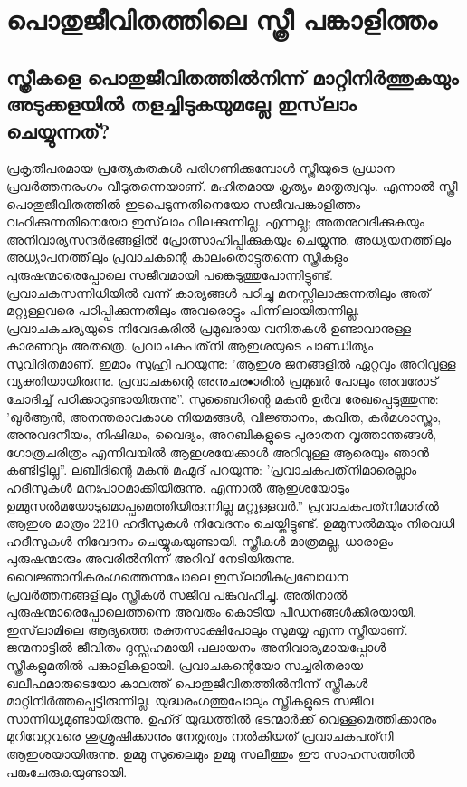 \chapter{പൊതുജീവിതത്തിലെ സ്ത്രീ പങ്കാളിത്തം }
 \section{ സ്ത്രീകളെ പൊതുജീവിതത്തില്‍നിന്ന് മാറ്റിനിര്‍ത്തുകയും അടുക്കളയില്‍ തളച്ചിടുകയുമല്ലേ ഇസ്‌ലാം ചെയ്യുന്നത്?}
   
പ്രകൃതിപരമായ പ്രത്യേകതകള്‍ പരിഗണിക്കുമ്പോള്‍ സ്ത്രീയുടെ പ്രധാന പ്രവര്‍ത്തനരംഗം വീടുതന്നെയാണ്. മഹിതമായ കൃത്യം മാതൃത്വവും. എന്നാല്‍ സ്ത്രീ പൊതുജീവിതത്തില്‍ ഇടപെടുന്നതിനെയോ സജീവപങ്കാളിത്തം വഹിക്കുന്നതിനെയോ ഇസ്‌ലാം വിലക്കുന്നില്ല. എന്നല്ല; അതനുവദിക്കുകയും അനിവാര്യസന്ദര്‍ഭങ്ങളില്‍ പ്രോത്സാഹിപ്പിക്കുകയും ചെയ്യുന്നു.
അധ്യയനത്തിലും അധ്യാപനത്തിലും പ്രവാചകന്റെ കാലംതൊട്ടുതന്നെ സ്ത്രീകളും പുരുഷന്മാരെപ്പോലെ സജീവമായി പങ്കെടുത്തുപോന്നിട്ടുണ്ട്. പ്രവാചകസന്നിധിയില്‍ വന്ന് കാര്യങ്ങള്‍ പഠിച്ചു മനസ്സിലാക്കുന്നതിലും അത് മറ്റുള്ളവരെ പഠിപ്പിക്കുന്നതിലും അവരൊട്ടും പിന്നിലായിരുന്നില്ല. പ്രവാചകചര്യയുടെ നിവേദകരില്‍ പ്രമുഖരായ വനിതകള്‍ ഉണ്ടാവാനുള്ള കാരണവും അതത്രെ.
പ്രവാചകപത്‌നി ആഇശയുടെ പാണ്ഡിത്യം സുവിദിതമാണ്. ഇമാം സുഹ്രി പറയുന്നു: 'ആഇശ ജനങ്ങളില്‍ ഏറ്റവും അറിവുള്ള വ്യക്തിയായിരുന്നു. പ്രവാചകന്റെ അനുചര•ാരില്‍ പ്രമുഖര്‍ പോലും അവരോട് ചോദിച്ച് പഠിക്കാറുണ്ടായിരുന്നു''. സുബൈറിന്റെ മകന്‍ ഉര്‍വ രേഖപ്പെടുത്തുന്നു: 'ഖുര്‍ആന്‍, അനന്തരാവകാശ നിയമങ്ങള്‍, വിജ്ഞാനം, കവിത, കര്‍മശാസ്ത്രം, അനുവദനീയം, നിഷിദ്ധം, വൈദ്യം, അറബികളുടെ പുരാതന വൃത്താന്തങ്ങള്‍, ഗോത്രചരിത്രം എന്നിവയില്‍ ആഇശയേക്കാള്‍ അറിവുള്ള ആരെയും ഞാന്‍ കണ്ടിട്ടില്ല''.
ലബീദിന്റെ മകന്‍ മഹ്മൂദ് പറയുന്നു: 'പ്രവാചകപത്‌നിമാരെല്ലാം ഹദീസുകള്‍ മനഃപാഠമാക്കിയിരുന്നു. എന്നാല്‍ ആഇശയോടും ഉമ്മുസല്‍മയോടുമൊപ്പമെത്തിയിരുന്നില്ല മറ്റുള്ളവര്‍.''
പ്രവാചകപത്‌നിമാരില്‍ ആഇശ മാത്രം 2210 ഹദീസുകള്‍ നിവേദനം ചെയ്തിട്ടുണ്ട്. ഉമ്മുസല്‍മയും നിരവധി ഹദീസുകള്‍ നിവേദനം ചെയ്യുകയുണ്ടായി. സ്ത്രീകള്‍ മാത്രമല്ല, ധാരാളം പുരുഷന്മാരും അവരില്‍നിന്ന് അറിവ് നേടിയിരുന്നു. വൈജ്ഞാനികരംഗത്തെന്നപോലെ ഇസ്‌ലാമികപ്രബോധന പ്രവര്‍ത്തനങ്ങളിലും സ്ത്രീകള്‍ സജീവ പങ്കുവഹിച്ചു. അതിനാല്‍ പുരുഷന്മാരെപ്പോലെത്തന്നെ അവരും കൊടിയ പീഡനങ്ങള്‍ക്കിരയായി. ഇസ്‌ലാമിലെ ആദ്യത്തെ രക്തസാക്ഷിപോലും സുമയ്യ എന്ന സ്ത്രീയാണ്. ജന്മനാട്ടില്‍ ജീവിതം ദുസ്സഹമായി പലായനം അനിവാര്യമായപ്പോള്‍ സ്ത്രീകളുമതില്‍ പങ്കാളികളായി.
പ്രവാചകന്റെയോ സച്ചരിതരായ ഖലീഫമാരുടെയോ കാലത്ത് പൊതുജീവിതത്തില്‍നിന്ന് സ്ത്രീകള്‍ മാറ്റിനിര്‍ത്തപ്പെട്ടിരുന്നില്ല. യുദ്ധരംഗത്തുപോലും സ്ത്രീകളുടെ സജീവ സാന്നിധ്യമുണ്ടായിരുന്നു. ഉഹ്ദ് യുദ്ധത്തില്‍ ഭടന്മാര്‍ക്ക് വെള്ളമെത്തിക്കാനും മുറിവേറ്റവരെ ശുശ്രൂഷിക്കാനും നേതൃത്വം നല്‍കിയത് പ്രവാചകപത്‌നി ആഇശയായിരുന്നു. ഉമ്മു സുലൈമും ഉമ്മു സലീത്തും ഈ സാഹസത്തില്‍ പങ്കുചേരുകയുണ്ടായി.
